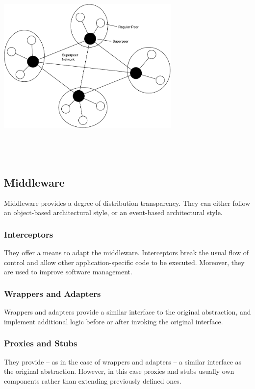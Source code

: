 \documentclass{article}
\begin{document}
\begin{center}
	\includegraphics[width=9cm, height=10cm, keepaspectratio]{assets/superpeer.pdf}
\end{center}

\subsection{Middleware}
Middleware provides a degree of distribution transparency. They can either follow an object-based architectural style, or an event-based architectural style.

\subsubsection{Interceptors}
They offer a means to adapt the middleware. Interceptors break the usual flow of control and allow other application-specific code to be executed. Moreover, they are used to improve software management.

\subsubsection{Wrappers and Adapters}
Wrappers and adapters provide a similar interface to the original abstraction, and implement additional logic before or after invoking the original interface.

\subsubsection{Proxies and Stubs}
They provide -- as in the case of wrappers and adapters -- a similar interface as the original abstraction. However, in this case proxies and stubs usually own components rather than extending previously defined ones.
\end{document}

